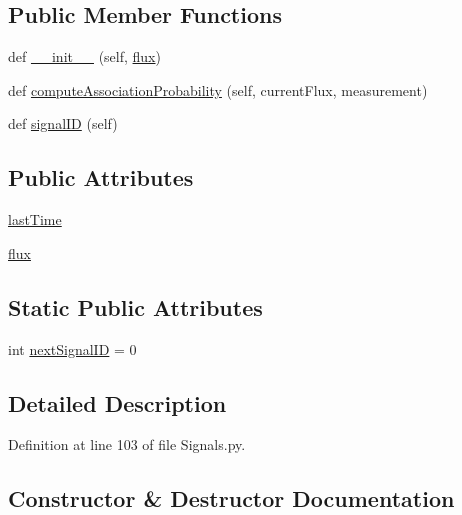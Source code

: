 \subsection*{Public Member Functions}
\begin{DoxyCompactItemize}
\item 
def \hyperlink{classSignals_1_1PoissonSource_a18f7e4d0f7f8385d195736a37fc0a445}{\+\_\+\+\_\+init\+\_\+\+\_\+} (self, \hyperlink{classSignals_1_1PoissonSource_a26e7bf25b1d9195bfded2a3ad6790bce}{flux})
\item 
def \hyperlink{classSignals_1_1PoissonSource_a8e7a6023e7ee53ed0b5b81c7d0aa361c}{compute\+Association\+Probability} (self, current\+Flux, measurement)
\item 
def \hyperlink{classSignals_1_1SignalSource_a85016cca8a7f1e188d314ced50577d05}{signal\+ID} (self)
\end{DoxyCompactItemize}
\subsection*{Public Attributes}
\begin{DoxyCompactItemize}
\item 
\hyperlink{classSignals_1_1PoissonSource_a66b0f3fb48cc130b6b07d7427092a522}{last\+Time}
\item 
\hyperlink{classSignals_1_1PoissonSource_a26e7bf25b1d9195bfded2a3ad6790bce}{flux}
\end{DoxyCompactItemize}
\subsection*{Static Public Attributes}
\begin{DoxyCompactItemize}
\item 
int \hyperlink{classSignals_1_1SignalSource_abcff0d069f17cb5ebe3eff15b6283a64}{next\+Signal\+ID} = 0
\end{DoxyCompactItemize}


\subsection{Detailed Description}


Definition at line 103 of file Signals.\+py.



\subsection{Constructor \& Destructor Documentation}
